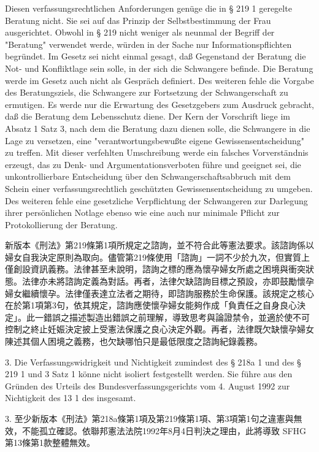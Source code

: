 \documentclass[12pt]{article}
\begin{document}
\begin{sourcepara}[title={原文C.9}]
Diesen verfassungsrechtlichen Anforderungen genüge die in § 219 \abbrAbs{} 1 \abbrStGB{} \abbrNF{} geregelte Beratung nicht. Sie sei auf das Prinzip der Selbstbestimmung der Frau ausgerichtet. Obwohl in § 219 nicht weniger als neunmal der Begriff der "Beratung" verwendet werde, würden in der Sache nur Informationspflichten begründet. Im Gesetz sei nicht einmal gesagt, daß Gegenstand der Beratung die Not- und Konfliktlage sein solle, in der sich die Schwangere befinde. Die Beratung werde im Gesetz auch nicht als Gespräch definiert. Des weiteren fehle die Vorgabe des Beratungsziels, die Schwangere zur Fortsetzung der Schwangerschaft zu ermutigen. Es werde nur die Erwartung des Gesetzgebers zum Ausdruck gebracht, daß die Beratung dem Lebensschutz diene. Der Kern der Vorschrift liege im Absatz 1 Satz 3, nach dem die Beratung dazu dienen solle, die Schwangere in die Lage zu versetzen, eine "verantwortungsbewußte eigene Gewissensentscheidung" zu treffen. Mit dieser verfehlten Umschreibung werde ein falsches Vorverständnis erzeugt, das zu Denk- und Argumentationsverboten führe und geeignet sei, die unkontrollierbare Entscheidung über den Schwangerschaftsabbruch mit dem Schein einer verfassungsrechtlich geschützten Gewissensentscheidung zu umgeben. Des weiteren fehle eine gesetzliche Verpflichtung der Schwangeren zur Darlegung ihrer persönlichen Notlage ebenso wie eine auch nur minimale Pflicht zur Protokollierung der Beratung.
\end{sourcepara}
\begin{transpara}
新版本《刑法》第219條第1項所規定之諮詢，並不符合此等憲法要求。該諮詢係以婦女自我決定原則為取向。儘管第219條使用「諮詢」一詞不少於九次，但實質上僅創設資訊義務。法律甚至未說明，諮詢之標的應為懷孕婦女所處之困境與衝突狀態。法律亦未將諮詢定義為對話。再者，法律欠缺諮詢目標之預設，亦即鼓勵懷孕婦女繼續懷孕。法律僅表達立法者之期待，即諮詢服務於生命保護。該規定之核心在於第1項第3句，依其規定，諮詢應使懷孕婦女能夠作成「負責任之自身良心決定」。此一錯誤之描述製造出錯誤之前理解，導致思考與論證禁令，並適於使不可控制之終止妊娠決定披上受憲法保護之良心決定外觀。再者，法律既欠缺懷孕婦女陳述其個人困境之義務，也欠缺哪怕只是最低限度之諮詢紀錄義務。
\end{transpara}

\begin{sourcepara}[title={原文C.10}]
3. Die Verfassungswidrigkeit und Nichtigkeit zumindest des § 218a \abbrAbs{} 1 und des § 219 \abbrAbs{} 1 und \abbrAbs{} 3 Satz 1 \abbrStGB{} \abbrNF{} könne nicht isoliert festgestellt werden. Sie führe aus den Gründen des Urteils des Bundesverfassungsgerichts vom 4. August 1992 zur Nichtigkeit des \abbrArt{} 13 \abbrNr{} 1 des \abbrSFHG{} insgesamt.
\end{sourcepara}
\begin{transpara}
3. 至少新版本《刑法》第218a條第1項及第219條第1項、第3項第1句之違憲與無效，不能孤立確認。依聯邦憲法法院1992年8月4日判決之理由，此將導致 SFHG 第13條第1款整體無效。
\end{transpara}
\end{document}
